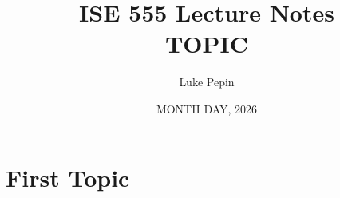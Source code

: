\documentclass[11pt]{article}
\title{ISE 555 Lecture Notes\\\large TOPIC}
\author{Luke Pepin}
\date{MONTH DAY, 2026}
\begin{document}
\maketitle

\section{First Topic}
\end{document}
